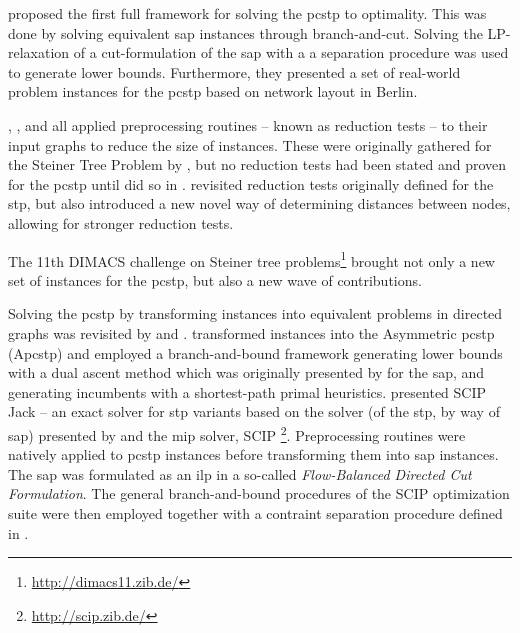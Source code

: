  \citet{ljubic2005solving} proposed the first full framework for solving the \gls{pcstp} to optimality.
 This was done by solving
 equivalent \gls{sap} instances through branch-and-cut. Solving the LP-relaxation of a cut-formulation of the \gls{sap} with a
 a separation procedure was used to generate lower bounds.
  Furthermore, they presented a set of real-world problem instances for the \gls{pcstp} based on network layout in Berlin.

  \citet{lucena2004strong}, \citet{Ljubic:2004:memetic}, and \citet{ljubic2005solving} all applied preprocessing routines
  -- known as reduction tests -- to their input graphs to reduce the size of instances.
  These were originally gathered for
  the Steiner Tree Problem by \citet{duin1989edge,duin1989reduction},
  but no reduction tests had been stated and proven for the \gls{pcstp}
  until \citeauthor{uchoa2006reduction} did so in \citeyear{uchoa2006reduction}.
  \citeauthor{uchoa2006reduction} revisited
  reduction tests originally defined for the \gls{stp},
  but also introduced a new
  novel way of determining distances between nodes,
  allowing for stronger reduction tests.

  The 11th DIMACS challenge on Steiner tree problems\footnote{\url{http://dimacs11.zib.de/}}
  brought not only a new set of instances for the \gls{pcstp}, but
  also a new wave of contributions.

  Solving the \gls{pcstp} by transforming instances into equivalent problems in directed graphs
  was revisited by \citet{leitner2016dual} and \citet{gamrath2017scip}.
  \citet{leitner2016dual} transformed instances into the Asymmetric \gls{pcstp} (A\gls{pcstp})
  and employed a
  branch-and-bound framework generating lower bounds with a dual ascent method which was originally presented by \citet{wong1984dual} for the \gls{sap}, and
  generating incumbents with
  a shortest-path primal heuristics.
  \citet{gamrath2017scip} presented SCIP Jack -- an exact solver for \gls{stp} variants based on the solver (of the \gls{stp}, by way of \gls{sap}) presented by
  \citet{koch1998solving} and the \gls{mip} solver, SCIP \footnote{\url{http://scip.zib.de/}}.
  Preprocessing routines were natively applied to \gls{pcstp} instances before transforming them into \gls{sap} instances.
  The \gls{sap} was formulated as an
  \gls{ilp} in a so-called \textit{Flow-Balanced Directed Cut Formulation}. The general branch-and-bound
  procedures of the SCIP optimization suite were
  then employed together with a contraint separation procedure defined in \citet{koch1998solving}.

